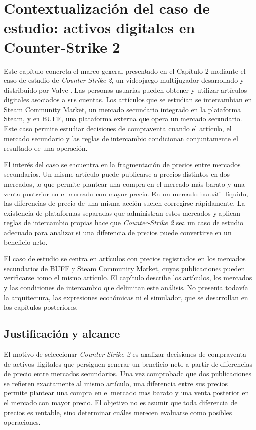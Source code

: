 \chapter{Contextualización del caso de estudio: activos digitales en Counter-Strike 2}
\label{chap:caso-estudio}

\noindent Este capítulo concreta el marco general presentado en el Capítulo 2 mediante el caso de estudio de \textit{Counter-Strike 2}, un videojuego multijugador desarrollado y distribuido por Valve \cite{counterStrike2}. Las personas usuarias pueden obtener y utilizar artículos digitales asociados a sus cuentas. Los artículos que se estudian se intercambian en Steam Community Market, un mercado secundario integrado en la plataforma Steam, y en BUFF, una plataforma externa que opera un mercado secundario. Este caso permite estudiar decisiones de compraventa cuando el artículo, el mercado secundario y las reglas de intercambio condicionan conjuntamente el resultado de una operación.

El interés del caso se encuentra en la fragmentación de precios entre mercados secundarios. Un mismo artículo puede publicarse a precios distintos en dos mercados, lo que permite plantear una compra en el mercado más barato y una venta posterior en el mercado con mayor precio. En un mercado bursátil líquido, las diferencias de precio de una misma acción suelen corregirse rápidamente. La existencia de plataformas separadas que administran estos mercados y aplican reglas de intercambio propias hace que \textit{Counter-Strike 2} sea un caso de estudio adecuado para analizar si una diferencia de precios puede convertirse en un beneficio neto.

El caso de estudio se centra en artículos con precios registrados en los mercados secundarios de BUFF y Steam Community Market, cuyas publicaciones pueden verificarse como el mismo artículo. El capítulo describe los artículos, los mercados y las condiciones de intercambio que delimitan este análisis. No presenta todavía la arquitectura, las expresiones económicas ni el simulador, que se desarrollan en los capítulos posteriores.

\section{Justificación y alcance}

El motivo de seleccionar \textit{Counter-Strike 2} es analizar decisiones de compraventa de activos digitales que persiguen generar un beneficio neto a partir de diferencias de precio entre mercados secundarios. Una vez comprobado que dos publicaciones se refieren exactamente al mismo artículo, una diferencia entre sus precios permite plantear una compra en el mercado más barato y una venta posterior en el mercado con mayor precio. El objetivo no es asumir que toda diferencia de precios es rentable, sino determinar cuáles merecen evaluarse como posibles operaciones.

